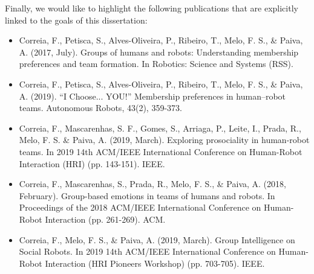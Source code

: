Finally, we would like to highlight the following publications that are explicitly linked to the goals of this dissertation:
\begin{itemize}
    \item Correia, F., Petisca, S., Alves-Oliveira, P., Ribeiro, T., Melo, F. S., \& Paiva, A. (2017, July). Groups of humans and robots: Understanding membership preferences and team formation. In Robotics: Science and Systems (RSS).
    \item Correia, F., Petisca, S., Alves-Oliveira, P., Ribeiro, T., Melo, F. S., \& Paiva, A. (2019). ``I Choose... YOU!'' Membership preferences in human–robot teams. Autonomous Robots, 43(2), 359-373.
    \item Correia, F., Mascarenhas, S. F., Gomes, S., Arriaga, P., Leite, I., Prada, R., Melo, F. S. \& Paiva, A. (2019, March). Exploring prosociality in human-robot teams. In 2019 14th ACM/IEEE International Conference on Human-Robot Interaction (HRI) (pp. 143-151). IEEE.
    \item Correia, F., Mascarenhas, S., Prada, R., Melo, F. S., \& Paiva, A. (2018, February). Group-based emotions in teams of humans and robots. In Proceedings of the 2018 ACM/IEEE International Conference on Human-Robot Interaction (pp. 261-269). ACM.
    \item Correia, F., Melo, F. S., \& Paiva, A. (2019, March). Group Intelligence on Social Robots. In 2019 14th ACM/IEEE International Conference on Human-Robot Interaction (HRI Pioneers Workshop) (pp. 703-705). IEEE.
\end{itemize}


